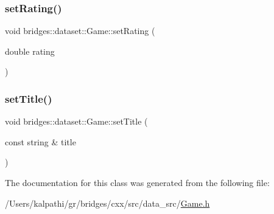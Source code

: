 \subsubsection{\texorpdfstring{setRating()}{setRating()}}
{\footnotesize\ttfamily void bridges\+::dataset\+::\+Game\+::set\+Rating (\begin{DoxyParamCaption}\item[{double}]{rating }\end{DoxyParamCaption})\hspace{0.3cm}{\ttfamily [inline]}}

\mbox{\label{classbridges_1_1dataset_1_1_game_a8f8f6e03458c05e20b0b446f9ddd211a}} 
\subsubsection{\texorpdfstring{setTitle()}{setTitle()}}
{\footnotesize\ttfamily void bridges\+::dataset\+::\+Game\+::set\+Title (\begin{DoxyParamCaption}\item[{const string \&}]{title }\end{DoxyParamCaption})\hspace{0.3cm}{\ttfamily [inline]}}



The documentation for this class was generated from the following file\+:\begin{DoxyCompactItemize}
\item 
/\+Users/kalpathi/gr/bridges/cxx/src/data\+\_\+src/\mbox{\hyperlink{_game_8h}{Game.\+h}}\end{DoxyCompactItemize}
